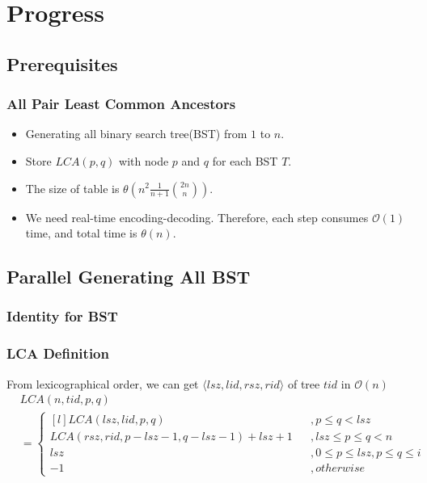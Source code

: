 \section{Progress}

\subsection{Prerequisites}
\begin{frame}
    \frametitle{All Pair Least Common Ancestors}
    \begin{itemize}
    	\setlength\itemsep{1em}
    	\item Generating all binary search tree(BST) from $1$ to $n$.
    	\item Store $\textit{LCA}(p, q)$ with node $p$ and $q$ for each BST $T$.
		\item The size of table is $\theta(n^2 \frac{1}{n+1} \binom{2n}{n})$.
		\item We need real-time encoding-decoding. Therefore, 
			each step consumes $\mathcal{O}(1)$ time, 
			and total time is $\mathcal{\theta}(n)$.
    \end{itemize}
\end{frame}

\subsection{Parallel Generating All BST}
\begin{frame}
	\frametitle{Identity for BST}
		
		
		
\end{frame}

\begin{frame}
	\frametitle{LCA Definition}
	From lexicographical order, we can get $\langle\mathit{lsz},\mathit{lid},\mathit{rsz},\mathit{rid}\rangle$ 
	of tree $\mathit{tid}$ in $\mathcal{O}(n)$
	\begin{align*}
		& \mathit{LCA}(n, \mathit{tid}, p, q) \\
			&= \left\{\begin{matrix*}[l]
 				\mathit{LCA}(\mathit{lsz}, \mathit{lid}, p, q) &&, p \le q < \mathit{lsz}\\ 
 				\mathit{LCA}(\mathit{rsz}, \mathit{rid}, p-\mathit{lsz}-1, q-\mathit{lsz}-1)+\mathit{lsz}+1 &&, 
 						\mathit{lsz} \le p \le q < n \\ 
 				\mathit{lsz} && , 0 \le p \le \mathit{lsz}, p \le q \le i\\ 
 				-1 && ,\mathit{otherwise}
			\end{matrix*}\right.
	\end{align*}
\end{frame}

